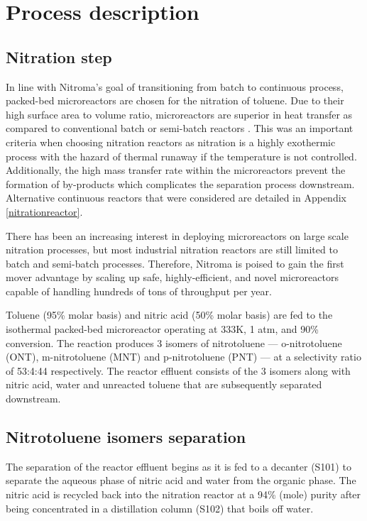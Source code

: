 \section{Process description}
\label{sec:process}
\subsection{Nitration step}
In line with Nitroma's goal of transitioning from batch to continuous process, packed-bed microreactors are chosen for the nitration of toluene. Due to their high surface area to volume ratio, microreactors are superior in heat transfer as compared to conventional batch or semi-batch reactors \cite{halder_nitration_2007}. This was an important criteria when choosing nitration reactors as nitration is a highly exothermic process with the hazard of thermal runaway if the temperature is not controlled. Additionally, the high mass transfer rate within the microreactors prevent the formation of by-products \cite{halder_nitration_2007} which complicates the separation process downstream.
Alternative continuous reactors that were considered are detailed in Appendix \ref{nitrationreactor}.

There has been an increasing interest in deploying microreactors on large scale nitration processes, but most industrial nitration reactors are still limited to batch and semi-batch processes. Therefore, Nitroma is poised to gain the first mover advantage by scaling up safe, highly-efficient, and novel microreactors capable of handling hundreds of tons of throughput per year.

Toluene (95\% molar basis) and nitric acid (50\% molar basis) are fed to the isothermal packed-bed microreactor operating at 333K, 1 atm, and 90\% conversion. The reaction produces 3 isomers of nitrotoluene --- o-nitrotoluene (ONT), m-nitrotoluene (MNT) and p-nitrotoluene (PNT) --- at a selectivity ratio of 53:4:44 respectively. The reactor effluent consists of the 3 isomers along with nitric acid, water and unreacted toluene that are subsequently separated downstream.

\subsection{Nitrotoluene isomers separation}
The separation of the reactor effluent begins as it is fed to a decanter (S101) to separate the aqueous phase of nitric acid and water from the organic phase. The nitric acid is recycled back into the nitration reactor at a 94\% (mole) purity after being concentrated in a distillation column (S102) that boils off water.

